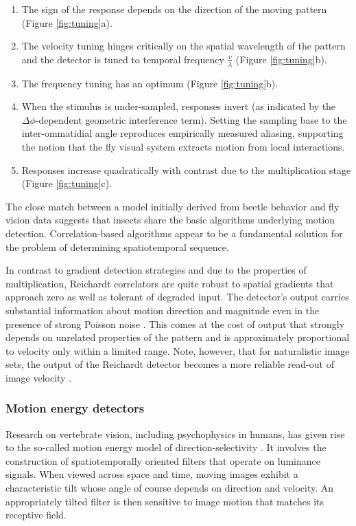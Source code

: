 \begin{enumerate}
    \item The sign of the response depends on the direction of the moving pattern (Figure \ref{fig:tuning}a).
    \item The velocity tuning hinges critically on the spatial wavelength of the pattern and the detector is tuned to temporal frequency $\frac{v}{\lambda}$  (Figure \ref{fig:tuning}b).
    \item The frequency tuning has an optimum (Figure \ref{fig:tuning}b).
    \item When the stimulus is under-sampled, responses invert (as indicated by the $\Delta\phi$-dependent geometric interference term). Setting the sampling base to the inter-ommatidial angle reproduces empirically measured aliasing, supporting the notion that the fly visual system extracts motion from local interactions.
    \item Responses increase quadratically with contrast due to the multiplication stage (Figure \ref{fig:tuning}c).
\end{enumerate}

The close match between a model initially derived from beetle behavior and fly vision data suggests that insects share the basic algorithms underlying motion detection. Correlation-based algorithms appear to be a fundamental solution for the problem of determining spatiotemporal sequence.

In contrast to gradient detection strategies and due to the properties of multiplication, Reichardt correlators are quite robust to spatial gradients that approach zero as well as tolerant of degraded input. The detector's output carries substantial information about motion direction and magnitude even in the presence of strong Poisson noise \citep{Borst:2007gz,Shi:2006du}. This comes at the cost of output that strongly depends on unrelated properties of the pattern and is approximately proportional to velocity only within a limited range. Note, however, that for naturalistic image sets, the output of the Reichardt detector becomes a more reliable read-out of image velocity \citep{Dror:2000cr,Dror:2001wc}.

\subsubsection{Motion energy detectors}
Research on vertebrate vision, including psychophysics in humans, has given rise to the so-called motion energy model of direction-selectivity \citep{Adelson:1985tx,vanSanten:1984wg}. It involves the construction of spatiotemporally oriented filters that operate on luminance signals. When viewed across space and time, moving images exhibit a characteristic tilt whose angle of course depends on direction and velocity. An appropriately tilted filter is then sensitive to image motion that matches its receptive field.


